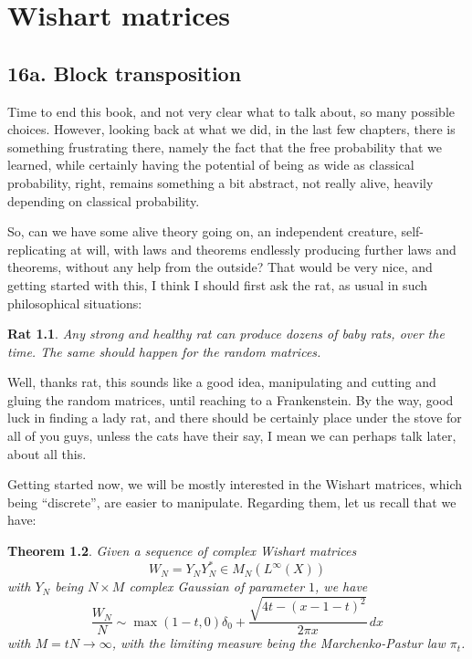 \documentclass[12pt]{amsbook}
\newtheorem{theorem}{Theorem}[chapter]
\newtheorem{rat}[theorem]{Rat}
\begin{document}
\chapter{Wishart matrices}

\section*{16a. Block transposition}

Time to end this book, and not very clear what to talk about, so many possible choices.  However, looking back at what we did, in the last few chapters, there is something frustrating there, namely the fact that the free probability that we learned, while certainly having the potential of being as wide as classical probability, right, remains something a bit abstract, not really alive, heavily depending on classical probability.

\bigskip

So, can we have some alive theory going on, an independent creature, self-replicating at will, with laws and theorems endlessly producing further laws and theorems, without any help from the outside? That would be very nice, and getting started with this, I think I should first ask the rat, as usual in such philosophical situations:

\begin{rat}
Any strong and healthy rat can produce dozens of baby rats, over the time. The same should happen for the random matrices.
\end{rat}

Well, thanks rat, this sounds like a good idea, manipulating and cutting and gluing the random matrices, until reaching to a Frankenstein. By the way, good luck in finding a lady rat, and there should be certainly place under the stove for all of you guys, unless the cats have their say, I mean we can perhaps talk later, about all this. 

\bigskip

Getting started now, we will be mostly interested in the Wishart matrices, which being ``discrete'', are easier to manipulate. Regarding them, let us recall that we have:


\begin{theorem}
Given a sequence of complex Wishart matrices
$$W_N=Y_NY_N^*\in M_N(L^\infty(X))$$
with $Y_N$ being $N\times M$ complex Gaussian of parameter $1$, we have
$$\frac{W_N}{N}\sim\max(1-t,0)\delta_0+\frac{\sqrt{4t-(x-1-t)^2}}{2\pi x}\,dx$$
with $M=tN\to\infty$, with the limiting measure being the Marchenko-Pastur law $\pi_t$.
\end{theorem}
\end{document}
